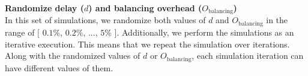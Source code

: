 \noindent \textbf{Randomize delay ($d$) and balancing overhead ($O_{\text{balancing}}$)}\\
\noindent In this set of simulations, we randomize both values of $d$ and $O_{\text{balancing}}$ in the range of $[$ $0.1\%$, $0.2\%$, ..., $5\%$ $]$. Additionally, we perform the simulations as an iterative execution. This means that we repeat the simulation over iterations. Along with the randomized values of $d$ or $O_{\text{balancing}}$, each simulation iteration can have different values of them.